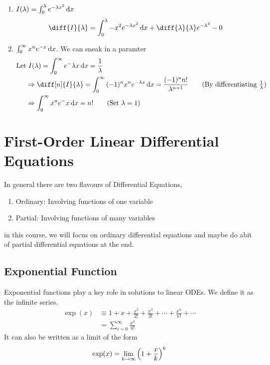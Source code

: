 \documentclass{article}
\begin{document}
\begin{eg}\leavevmode
    \begin{enumerate}
        \item $I(\lambda) = \int_{0}^{\lambda}{e^{-\lambda x^2} \mathop{}\!\mathrm{d} x}$
        \[
            \diff{I}{\lambda} = \int_{0}^{\lambda}{-x^2e^{-\lambda x^2} \diffd x} + \diff{\lambda}{\lambda}e^{-\lambda^3} - 0
        \]
        \item $\int_{0}^{\infty}{x^ne^{-x} \mathop{}\!\mathrm{d} x}$. We can sneak in a paramter
        \begin{align*}
            \text{Let} &\ I(\lambda) = \int_{0}^{\infty}{e^-\lambda x \diffd x} = \frac{1}{\lambda} \\
            &\Rightarrow \diff[n]{I}{\lambda} = \int_{0}^{\infty}{(-1)^n x^n e^{-\lambda x} \diffd x} = \frac{(-1)^n n!}{\lambda^{n+1}} \tag{By differentiating $\frac{1}{\lambda}$} \\
            &\Rightarrow \int_{0}^{\infty}{x^ne^-x \diffd x} = n! \tag{Set $\lambda = 1$}
        \end{align*}
    \end{enumerate}
\end{eg}

\section{First-Order Linear Differential Equations}
In general there are two flavours of Differential Equations,
\begin{enumerate}
    \item Ordinary: Involving functions of one variable
    \item Partial: Involving functions of many variables
\end{enumerate}
in this course, we will focus on ordinary differential equations and maybe do abit of partial differential equations at the end.
\subsection{Exponential Function}

\begin{defi}
    Exponential functions play a key role in solutions to linear ODEs. We define it as the infinite series.
    \begin{align*}
        \exp(x) &\equiv 1 + x + \frac{x^2}{2!} + \frac{x^3}{3!} + \cdots + \frac{x^n}{n!} + \cdots \\
        &= \sum_{i=0}^{\infty}{\frac{x^n}{n!}}
    \end{align*}
    It can also be written as a limit of the form
    \[
        \exp(x) = \lim_{k \rightarrow \infty} \left( 1 + \frac{x}{k} \right)^k  
    \]
\end{defi}
\end{document}
